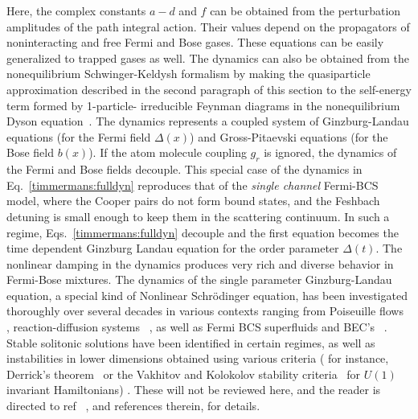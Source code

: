 \documentclass[aps,pra,floats,epsfig,pdflatex]{revtex4}                                                              %
\begin{document}
 {Here, the complex constants $a-d$ and $f$ can be obtained from the perturbation amplitudes of the path integral action. Their values depend on the propagators of noninteracting and free Fermi and Bose gases. These equations can be easily generalized to trapped gases as well. The dynamics can also be obtained from the nonequilibrium Schwinger-Keldysh formalism by making the quasiparticle approximation described in the second paragraph of this section to the self-energy term formed by 1-particle- irreducible Feynman diagrams in the nonequilibrium Dyson equation~\cite{rammer}. The dynamics represents a coupled system of Ginzburg-Landau equations (for the Fermi field $\Delta(x)$) and Gross-Pitaevski equations (for the Bose field $b(x)$). If the atom molecule coupling $g_r$ is ignored, the dynamics of the Fermi and Bose fields decouple. This special case of
the dynamics in Eq.}~\ref{timmermans:fulldyn} { reproduces that of the \textit{single channel} Fermi-BCS model, where the Cooper pairs do not form bound states, and the Feshbach detuning is small enough to keep them in the scattering continuum. In such a regime, Eqs.}~\ref{timmermans:fulldyn} { decouple and the first equation becomes the time dependent Ginzburg Landau equation for the order parameter $\Delta(t)$.  The nonlinear damping in the dynamics produces very rich and diverse behavior in Fermi-Bose mixtures. The dynamics of the single parameter Ginzburg-Landau equation, a special kind of Nonlinear Schr\"odinger equation, has been investigated thoroughly over several decades in various contexts ranging from Poiseuille flows}~\cite{pflowgl} {, reaction-diffusion systems}~\cite{rdgl} {, as well as Fermi BCS superfluids and BEC's}~\cite{glreview} {. Stable solitonic solutions have been identified in certain regimes, as well as instabilities in lower dimensions obtained using various criteria} (
for 
instance, Derrick's theorem~\cite{derrick,khare} or the Vakhitov and Kolokolov stability criteria~\cite{vakhitov,khare} for $U(1)$ invariant Hamiltonians) {. These will not be reviewed here, and the reader is directed to ref}~\cite{glreview} {, and references therein, for details.}
\end{document}
